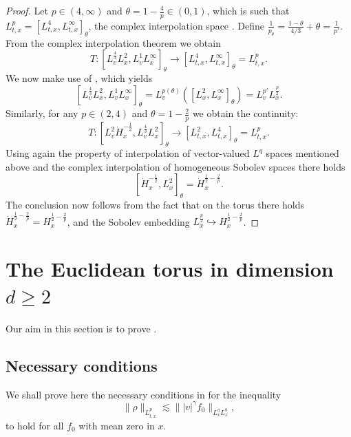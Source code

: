 \documentclass[11pt,a4paper,reqno]{amsart}
\theoremstyle{plain}
\theoremstyle{remark}
\begin{document}
\begin{proof} 
Let $p \in (4, \infty)$ and $\theta = 1 - \frac{4}{p} \in (0,1)$, which is such that $L^p_{t,x}=[L^{4}_{t,x},L^{\infty}_{t,x}]_{\theta}$, the complex interpolation space \cite[Chapter 4]{BerghLofstrom}. Define $\frac{1}{p_\theta} = \frac{1-\theta}{4/3} + \theta = \frac{1}{p'}$.
From the complex interpolation theorem \cite[Theorem 4.1.2]{BerghLofstrom} we obtain 
\[
    T : [L^{\frac{4}{3}}_vL^{2}_x,L^1_vL^{\infty}_x]_{\theta} \to [L^{4}_{t,x},L^{\infty}_{t,x}]_{\theta}=L^p_{t,x}.
\]
We now make use of \cite[Theorem 5.1.2]{BerghLofstrom}, which yields 
\[
    [L^{\frac{4}{3}}_vL^{2}_x,L^1_vL^{\infty}_x]_{\theta}=L^{p(\theta)}_v([L^2_x,L^{\infty}_x]_{\theta})=L^{p'}_vL^{\frac{p}{2}}_x.
\]
Similarly, for any $p\in(2,4)$ and $\theta = 1-\frac{2}{p}$ we obtain the continuity: 
\[
    T : [L^2_v\dot H^{-\frac{1}{2}}_x,L^{\frac{4}{3}}_vL^2_x]_{\theta} \longrightarrow [L^2_{t,x},L^4_{t,x}]_{\theta}=L^p_{t,x}.
\]
Using again the property of interpolation of vector-valued $L^q$ spaces mentioned above and the complex interpolation of homogeneous Sobolev spaces there holds 
\[
    [\dot H_x^{-\frac{1}{2}},L^2_x]_\theta = \dot{H}^{\frac{1}{2}-\frac{2}{p}}_x. 
\]
The conclusion now follows from the fact that on the torus there holds $\dot{H}^{\frac{1}{2}-\frac{2}{p}}_x=H^{\frac{1}{2}-\frac{2}{p}}_x$, and the Sobolev embedding $L^{\frac{p}{2}}_x \hookrightarrow H^{\frac{1}{2}-\frac{2}{p}}_x$.
\end{proof}

\section{The Euclidean torus in dimension \texorpdfstring{$d \geq 2$}{>=}}

Our aim in this section is to prove .

\subsection{Necessary conditions}

We shall prove here the necessary conditions in  for the inequality
\begin{equation}\label{gamma-p-a-b-ineq}
    \|\rho\|_{L^p_{t,x}} \lesssim \||v|^{\gamma}f_0\|_{L^a_vL^b_x},
\end{equation}
to hold for all $f_0$ with mean zero in $x$.
\end{document}
